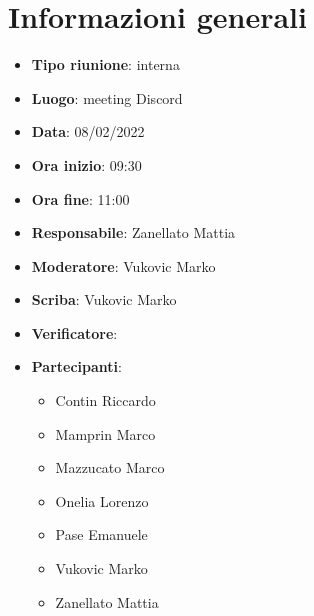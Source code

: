 \section{Informazioni generali}
\begin{itemize}
  \item \textbf{Tipo riunione}: interna
  \item \textbf{Luogo}: meeting Discord
  \item \textbf{Data}: 08/02/2022
  \item \textbf{Ora inizio}: 09:30
  \item \textbf{Ora fine}: 11:00
  \item \textbf{Responsabile}: Zanellato Mattia
  \item \textbf{Moderatore}: Vukovic Marko
  \item \textbf{Scriba}: Vukovic Marko
  \item \textbf{Verificatore}: 
  \item \textbf{Partecipanti}:
  \begin{itemize}
    \item Contin Riccardo
    \item Mamprin Marco
    \item Mazzucato Marco
    \item Onelia Lorenzo
    \item Pase Emanuele
    \item Vukovic Marko
    \item Zanellato Mattia
  \end{itemize}
\end{itemize}
